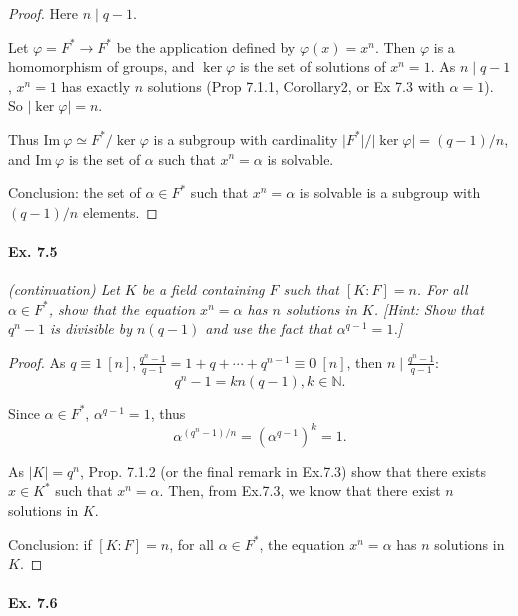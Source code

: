 \documentclass[11pt,a4paper]{article}
\begin{document}
\begin{proof}
Here $n \mid q-1$.

Let $\varphi = F^* \to F^*$ be the application defined by $\varphi(x) = x^n$. Then $\varphi$ is a homomorphism of groups, and $\ker \varphi$ is the set of solutions of $x^n = 1$.
As $n \mid q-1$, $x^n = 1$ has exactly $n$ solutions (Prop 7.1.1, Corollary2, or Ex 7.3 with $\alpha = 1$). So $\vert \ker \varphi \vert = n$.

Thus $\mathrm{Im}\ \varphi \simeq F^*/\ker \varphi$ is a subgroup with cardinality $\vert F^* \vert / \vert \ker \varphi \vert = (q-1)/n$, and $\mathrm{Im} \ \varphi$ is the set of $\alpha$ such that $x^n = \alpha$ is solvable.

Conclusion: the set of $\alpha \in F^*$ such that $x^n = \alpha$ is solvable is a subgroup with $(q-1)/n$ elements.

\end{proof}

\paragraph{Ex. 7.5}

{\it (continuation) Let $K$ be a field containing $F$ such that $[K:F] = n$. For all $\alpha \in F^*$, show that the equation $x^n = \alpha$ has $n$ solutions in $K$. [Hint: Show that $q^n-1$ is divisible by $n(q-1)$ and use the fact that $\alpha^{q-1} = 1$.]

}

\begin{proof}
As $q\equiv 1 \ [n], \frac{q^n-1}{q-1} = 1+q+\cdots+q^{n-1} \equiv 0 \ [n]$, then $n \mid \frac{q^n-1}{q-1} : $
$$q^n-1 = k n (q-1), k \in \mathbb{N}.$$

Since $\alpha \in F^*$, $\alpha^{q-1} = 1$, thus $$\alpha^{(q^n-1)/n} = (\alpha^{q-1})^k = 1.$$

As $\vert K \vert = q^n$, Prop. 7.1.2 (or the final remark in Ex.7.3) show that there exists $x \in K^*$ such that $x^n = \alpha$. Then, from Ex.7.3, we know that there exist $n$ solutions in $K$.

Conclusion: if $[K:F] = n$, for all $\alpha \in F^*$, the equation $x^n = \alpha$ has $n$ solutions in $K$.

\end{proof}

\paragraph{Ex. 7.6}
\end{document}
